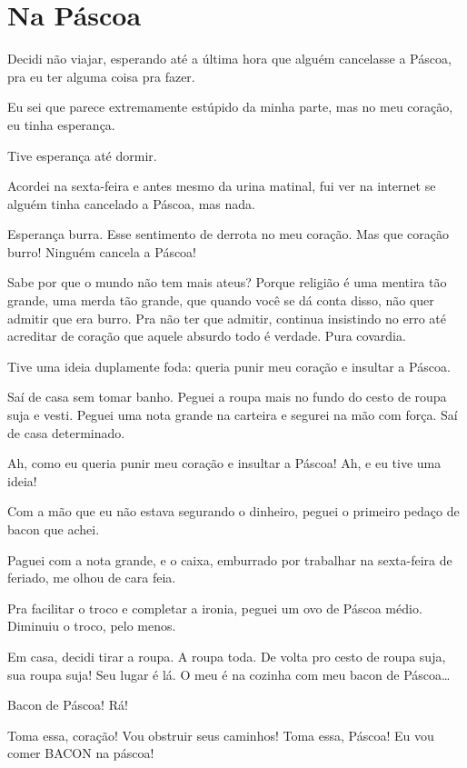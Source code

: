 \chapter{Na Páscoa}

Decidi não viajar, esperando até a última hora que alguém cancelasse a Páscoa, pra eu ter alguma coisa pra fazer.

Eu sei que parece extremamente estúpido da minha parte, mas no meu coração, eu tinha esperança.

Tive esperança até dormir.

Acordei na sexta-feira e antes mesmo da urina matinal, fui ver na internet se alguém tinha cancelado a Páscoa, mas nada.

\begin{sloppypar}
Esperança burra. Esse sentimento de derrota no meu coração. Mas que coração burro! Ninguém cancela a Páscoa!
\end{sloppypar}

Sabe por que o mundo não tem mais ateus? Porque religião é uma mentira tão grande, uma merda tão grande, que quando você se dá conta disso, não quer admitir que era burro. Pra não ter que admitir, continua insistindo no erro até acreditar de coração que aquele absurdo todo é verdade. Pura covardia.

Tive uma ideia duplamente foda: queria punir meu coração e insultar a Páscoa.

Saí de casa sem tomar banho. Peguei a roupa mais no fundo do cesto de roupa suja e vesti. Peguei uma nota grande na carteira e segurei na mão com força. Saí de casa determinado.

Ah, como eu queria punir meu coração e insultar a Páscoa! Ah, e eu tive uma ideia!

Com a mão que eu não estava segurando o dinheiro, peguei o primeiro pedaço de bacon que achei.

Paguei com a nota grande, e o caixa, emburrado por trabalhar na sexta-feira de feriado, me olhou de cara feia.

Pra facilitar o troco e completar a ironia, peguei um ovo de Páscoa médio. Diminuiu o troco, pelo menos.

Em casa, decidi tirar a roupa. A roupa toda. De volta pro cesto de roupa suja, sua roupa suja! Seu lugar é lá. O meu é na cozinha com meu bacon de Páscoa\ldots

Bacon de Páscoa! Rá!

Toma essa, coração! Vou obstruir seus caminhos! Toma essa, Páscoa! Eu vou comer BACON na páscoa!

